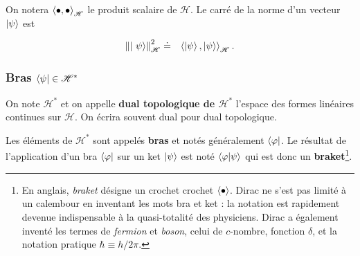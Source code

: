 On notera $\braket{\bullet , \bullet}_{\mathscr H}$ le produit scalaire de $\mathscr H$. Le carré de la norme d'un vecteur $\ket{\psi}$ est 

\begin{eqnarray}
    \left \Vert \ket { \psi } \right \Vert_{\mathscr H}^2 & \doteq & \braket{\ket{\psi} , \ket{\psi} }_{\mathscr H}.
\end{eqnarray}

\subsubsection{Bras $\bra{\psi} \in \mathscr H^\ast$}

\begin{Defi}
    On note $\bm{\mathscr H^\ast}$ et on appelle {\bf dual topologique de $\bm{\mathscr H^\ast}$} l'espace des formes linéaires continues sur $\mathcal H$. On écrira souvent \guillemotleft{}dual\guillemotright{} pour \guillemotleft{}dual topologique\guillemotright{}.
\end{Defi}

\begin{Defi}[\bf Bras]
    Les éléments de $\mathscr H^\ast$ sont appelés {\bf bras} et notés généralement $\bra{\varphi}$. Le résultat de l'application d'un bra $\bra{\varphi}$ sur un ket $\ket{\psi}$ est noté $\braket{\varphi\vert\psi}$ qui est donc un {\bf braket}\footnote{En anglais, {\em braket} désigne un crochet \guillemotleft{}crochet\guillemotright{} $\braket{\bullet}$. Dirac ne s'est pas limité à un calembour en inventant les mots \guillemotleft{}bra\guillemotright{} et \guillemotleft{}ket\guillemotright{} : la notation est rapidement devenue indispensable à la quasi-totalité des physiciens. Dirac a également inventé les termes de {\em fermion} et {\em boson}, celui de $c$-nombre, \guillemotleft{}fonction \guillemotright{} $\delta$, et la notation pratique $\hbar \equiv h /2\pi$.}.
\end{Defi}

